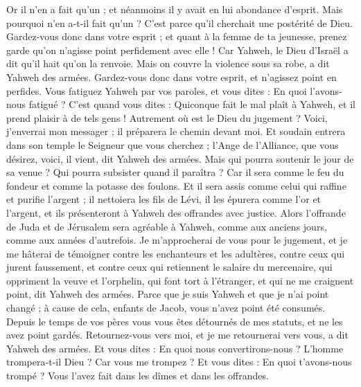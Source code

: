 \begin{multicols}{2}
Or il n'en a fait qu'un ; et néanmoins il y avait en lui abondance d'esprit. Mais pourquoi n'en a-t-il fait qu'un ? C'est parce qu'il cherchait une postérité de Dieu. Gardez-vous donc dans votre esprit ; et quant à la femme de ta jeunesse, prenez garde qu'on n'agisse point perfidement avec elle !
Car Yahweh, le Dieu d'Israël a dit qu'il hait qu'on la renvoie. Mais on couvre la violence sous sa robe, a dit Yahweh des armées. Gardez-vous donc dans votre esprit, et n'agissez point en perfides.
Vous fatiguez Yahweh par vos paroles, et vous dites : En quoi l'avons-nous fatigué ? C'est quand vous dites : Quiconque fait le mal plaît à Yahweh, et il prend plaisir à de tels gens ! Autrement où est le Dieu du jugement ?
\VerseOne{}Voici, j'enverrai mon messager ; il préparera le chemin devant moi. Et soudain entrera dans son temple le Seigneur que vous cherchez ; l'Ange de l'Alliance, que vous désirez, voici, il vient, dit Yahweh des armées.
Mais qui pourra soutenir le jour de sa venue ? Qui pourra subsister quand il paraîtra ? Car il sera comme le feu du fondeur et comme la potasse des foulons.
Et il sera assis comme celui qui raffine et purifie l'argent ; il nettoiera les fils de Lévi, il les épurera comme l'or et l'argent, et ils présenteront à Yahweh des offrandes avec justice.
Alors l'offrande de Juda et de Jérusalem sera agréable à Yahweh, comme aux anciens jours, comme aux années d'autrefois.
Je m'approcherai de vous pour le jugement, et je me hâterai de témoigner contre les enchanteurs et les adultères, contre ceux qui jurent faussement, et contre ceux qui retiennent le salaire du mercenaire, qui oppriment la veuve et l'orphelin, qui font tort à l'étranger, et qui ne me craignent point, dit Yahweh des armées.
Parce que je suis Yahweh et que je n'ai point changé ; à cause de cela, enfants de Jacob, vous n'avez point été consumés.
Depuis le temps de vos pères vous vous êtes détournés de mes statuts, et ne les avez point gardés. Retournez-vous vers moi, et je me retournerai vers vous, a dit Yahweh des armées. Et vous dites : En quoi nous convertirons-nous ?
L'homme trompera-t-il Dieu ? Car vous me trompez ? Et vous dites : En quoi t'avons-nous trompé ? Vous l'avez fait dans les dîmes et dans les offrandes.

\end{multicols}
